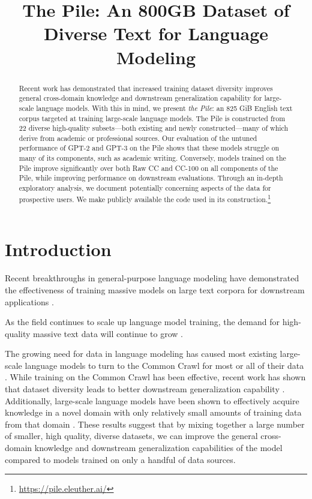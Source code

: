 \title{The Pile: An 800GB Dataset of Diverse Text for Language Modeling}

\begin{abstract}
Recent work has demonstrated that increased training dataset diversity improves general cross-domain knowledge and downstream generalization capability for large-scale language models. With this in mind, we present \textit{the Pile}: an 825 GiB English text corpus targeted at training large-scale language models. The Pile is constructed from 22 diverse high-quality subsets---both existing and newly constructed---many of which derive from academic or professional sources. Our evaluation of the untuned performance of GPT-2 and GPT-3 on the Pile shows that these models struggle on many of its components, such as academic writing. Conversely, models trained on the Pile improve significantly over both Raw CC and CC-100 on all components of the Pile, while improving performance on downstream evaluations. Through an in-depth exploratory analysis, we document potentially concerning aspects of the data for prospective users. We make publicly available the code used in its construction.\footnote{\url{https://pile.eleuther.ai/}}
\end{abstract}

\section{Introduction}

Recent breakthroughs in general-purpose language modeling have demonstrated the effectiveness of training massive models on large text corpora for downstream applications \citep{GPT2,Megatron,T5,TuringNLG,GPT3,GShard}. 

As the field continues to scale up language model training, the demand for high-quality massive text data will continue to grow \citep{scaling-nlms}.

The growing need for data in language modeling has caused most existing large-scale language models to turn to the Common Crawl for most or all of their data \citep{GPT3,T5}. While training on the Common Crawl has been effective, recent work has shown that dataset diversity leads to better downstream generalization capability \citep{TuringNLG}. Additionally, large-scale language models have been shown to effectively acquire knowledge in a novel domain with only relatively small amounts of training data from that domain \citep{TuringNLG,GPT3,extractingtrainingdata}. These results suggest that by mixing together a large number of smaller, high quality, diverse datasets, we can improve the general cross-domain knowledge and downstream generalization capabilities of the model compared to models trained on only a handful of data sources.

